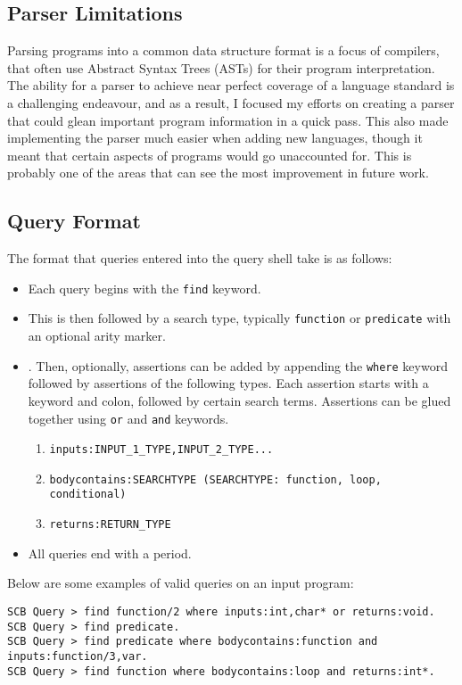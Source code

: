 \documentclass{article}
\begin{document}
\subsection{Parser Limitations}

Parsing programs into a common data structure format is a focus of compilers, that often use Abstract Syntax Trees (ASTs) for their program interpretation. The ability for a parser to achieve near perfect coverage of a language standard is a challenging endeavour, and as a result, I focused my efforts on creating a parser that could glean important program information in a quick pass. This also made implementing the parser much easier when adding new languages, though it meant that certain aspects of programs would go unaccounted for. This is probably one of the areas that can see the most improvement in future work.

\subsection{Query Format}

The format that queries entered into the query shell take is as follows:
\begin{itemize}
    \item Each query begins with the \texttt{find} keyword.
    \item This is then followed by a search type, typically \texttt{function} or \texttt{predicate} with an optional arity marker.
    \item. Then, optionally, assertions can be added by appending the \texttt{where} keyword followed by assertions of the following types. Each assertion starts with a keyword and colon, followed by certain search terms. Assertions can be glued together using \texttt{or} and \texttt{and} keywords.
    \begin{enumerate}
        \item \texttt{inputs:INPUT\_1\_TYPE,INPUT\_2\_TYPE...}
        \item \texttt{bodycontains:SEARCHTYPE (SEARCHTYPE: function, loop, conditional)}
        \item \texttt{returns:RETURN\_TYPE}
    \end{enumerate}
    \item All queries end with a period.
\end{itemize}

Below are some examples of valid queries on an input program:

\begin{Verbatim}[frame=single]
SCB Query > find function/2 where inputs:int,char* or returns:void.
SCB Query > find predicate.
SCB Query > find predicate where bodycontains:function and inputs:function/3,var.
SCB Query > find function where bodycontains:loop and returns:int*.
\end{Verbatim}
\end{document}
